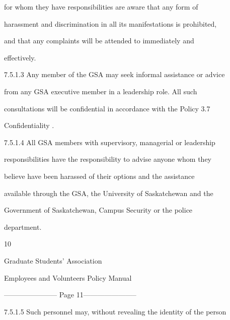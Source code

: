          for  whom  they  have  responsibilities  are  aware  that  any  form  of  

         harassment  and  discrimination  in  all  its  manifestations  is  prohibited,  

         and   that      any   complaints   will   be             attended   to        immediately   and  

         effectively.  



  



7.5.1.3  Any  member  of  the  GSA  may  seek  informal  assistance  or  advice  

         from   any   GSA  executive  member  in  a  leadership  role.  All  such  

         consultations  will  be  confidential  in  accordance  with  the  Policy  3.7  

         Confidentiality .  



  



7.5.1.4  All   GSA   members   with   supervisory,   managerial   or   leadership  

         responsibilities  have  the  responsibility  to  advise  anyone  whom  they  

         believe   have   been   harassed   of   their   options   and   the   assistance  

         available  through  the  GSA,  the  University  of  Saskatchewan  and  the  

         Government            of    Saskatchewan,           Campus         Security       or    the    police  

         department.  



  



                                                       10  

  

  

                                  Graduate  Students’ Association  



                        Employees and Volunteers Policy Manual  


----------------------- Page 11-----------------------

7.5.1.5  Such  personnel  may,  without  revealing  the  identity  of  the  person  

